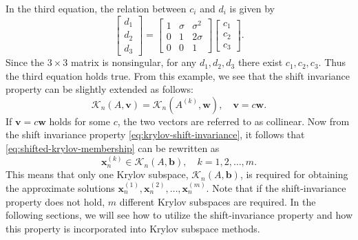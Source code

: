 {In the third equation, the relation between $c_i$ and $d_i$ is given by}
\[\begin{bmatrix}d_1\\d_2\\d_3\end{bmatrix}=\begin{bmatrix}1&\sigma&\sigma^2\\0&1&2\sigma\\0&0&1\end{bmatrix}\begin{bmatrix}c_1\\c_2\\c_3\end{bmatrix}.\]
{Since the $3\times3$ matrix is nonsingular, for any $d_1,d_2,d_3$ there exist $c_1,c_2,c_3$. Thus the third equation holds true. From this example, we see that the shift invariance property can be slightly extended as follows:}
\[\mathcal K_n(A,\bm v)=\mathcal K_n(A^{(k)},\bm w),\quad\bm v=c\bm w.\]
{If $\bm v=c\bm w$ holds for some $c$, the two vectors are referred to as collinear.}
{Now from the shift invariance property \eqref{eq:krylov-shift-invariance}, it follows that \eqref{eq:shifted-krylov-membership} can be rewritten as}
\[\bm x_n^{(k)}\in\mathcal K_n(A,\bm b),\quad k=1,2,\ldots,m.\]
{This means that only one Krylov subspace, $\mathcal K_n(A,\bm b)$, is required for obtaining the approximate solutions $\bm x_n^{(1)},\bm x_n^{(2)},\ldots,\bm x_n^{(m)}$. Note that if the shift-invariance property does not hold, $m$ different Krylov subspaces are required. In the following sections, we will see how to utilize the shift-invariance property and how this property is incorporated into Krylov subspace methods.}
